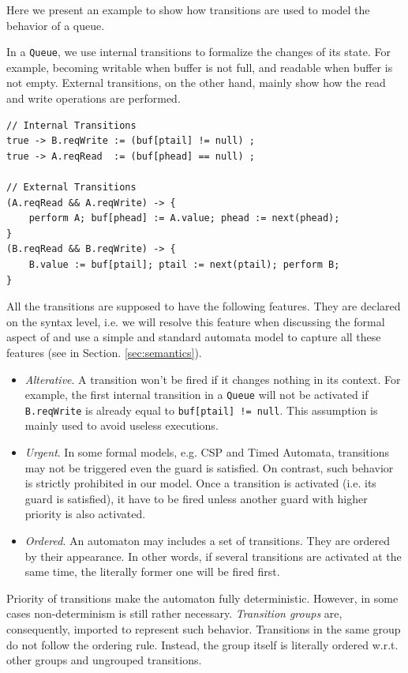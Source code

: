 Here we present an example to show how transitions are used to model the behavior of a queue.
\begin{example} In a \texttt{Queue}, we use internal transitions to formalize the changes of its state. For example, becoming writable when buffer is not full, and readable when buffer is not empty. External transitions, on the other hand, mainly show how the read and write operations are performed.
\begin{lstlisting}
// Internal Transitions
true -> B.reqWrite := (buf[ptail] != null) ;
true -> A.reqRead  := (buf[phead] == null) ;

// External Transitions
(A.reqRead && A.reqWrite) -> {
    perform A; buf[phead] := A.value; phead := next(phead);
}
(B.reqRead && B.reqWrite) -> {
    B.value := buf[ptail]; ptail := next(ptail); perform B;
}
\end{lstlisting}
\label{exp:trans_queue}
\end{example}

All the transitions are supposed to have the following features. They are declared on the syntax level, i.e. we will resolve this feature when discussing the formal aspect of \lang{} and use a simple and standard automata model to capture all these features (see in Section. \ref{sec:semantics}).

\begin{itemize}
    \item \emph{Alterative}. A transition won't be fired if it changes nothing in its context. For example, the first internal transition in a \texttt{Queue} will not be activated if \texttt{B.reqWrite} is already equal to \texttt{buf[ptail] != null}. This assumption is mainly used to avoid useless executions.
    \item \emph{Urgent}. In some formal models, e.g. CSP\cite{HoareCsp1985} and Timed Automata\cite{AlurTcs1994}, transitions may not be triggered even the guard is satisfied. On contrast, such behavior is strictly prohibited in our model. Once a transition is activated (i.e. its guard is satisfied), it have to be fired unless another guard with higher priority is also activated.
    \item \emph{Ordered}. An automaton may includes a set of transitions. They are ordered by their appearance. In other words, if several transitions are activated at the same time, the literally former one will be fired first.
\end{itemize}

Priority of transitions make the automaton fully deterministic. However, in some cases non-determinism is still rather necessary. \emph{Transition groups} are, consequently, imported to represent such behavior. Transitions in the same group do not follow the ordering rule. Instead, the group itself is literally ordered w.r.t. other groups and ungrouped transitions.

